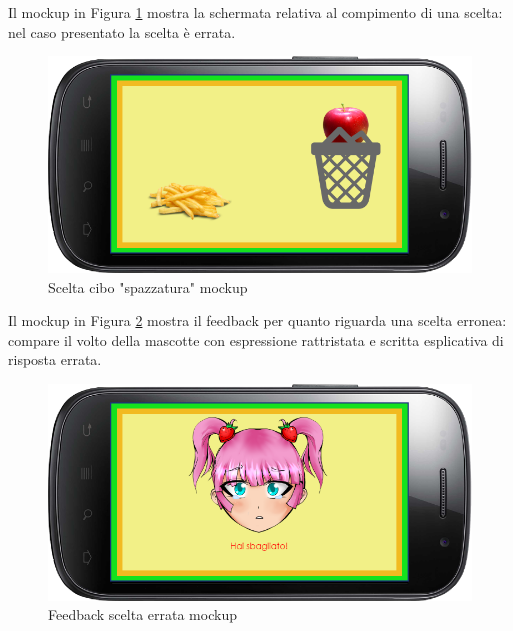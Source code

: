 Il mockup in Figura \ref{fig:Scelta "E' sano o no?"} mostra la schermata relativa al compimento di una scelta: nel caso presentato la scelta è errata.
\vspace{70pt}
\begin{figure}[htbp]
\centering
\includegraphics[width=\textwidth]{Images/Mockup/sanoscelta}
\caption{Scelta cibo "spazzatura" mockup}
\label{fig:Scelta "E' sano o no?"}
\end{figure}
\clearpage

Il mockup in Figura \ref{fig:Feedback scelta errata} mostra il feedback per quanto riguarda una scelta erronea: compare il volto della mascotte con espressione rattristata e scritta esplicativa di risposta errata.
\vspace{70pt}
\begin{figure}[htbp]
\centering
\includegraphics[width=\textwidth]{Images/Mockup/sanofeedback}
\caption{Feedback scelta errata mockup}
\label{fig:Feedback scelta errata}
\end{figure}
\clearpage


